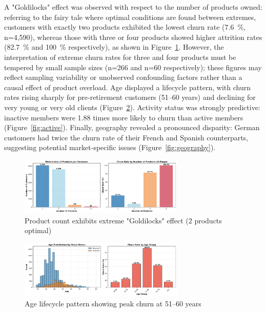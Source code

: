 \documentclass[12pt]{article}
\begin{document}
A "Goldilocks" effect was observed with respect to the number of products owned: referring to the fairy tale where optimal conditions are found between extremes, customers with exactly two products exhibited the lowest churn rate (7.6~\%, n=4,590), whereas those with three or four products showed higher attrition rates (82.7~\% and 100~\% respectively), as shown in Figure~\ref{fig:products}.  However, the interpretation of extreme churn rates for three and four products must be tempered by small sample sizes (n=266 and n=60 respectively); these figures may reflect sampling variability or unobserved confounding factors rather than a causal effect of product overload.  Age displayed a lifecycle pattern, with churn rates rising sharply for pre‑retirement customers (51–60 years) and declining for very young or very old clients (Figure~\ref{fig:age}).  Activity status was strongly predictive: inactive members were 1.88 times more likely to churn than active members (Figure~\ref{fig:active}).  Finally, geography revealed a pronounced disparity: German customers had twice the churn rate of their French and Spanish counterparts, suggesting potential market‑specific issues (Figure~\ref{fig:geography}).

\begin{figure}[H]
\centering
\includegraphics[width=0.7\textwidth]{img/04_products_churn_analysis.png}
\caption{Product count exhibits extreme "Goldilocks" effect (2 products optimal)}
\label{fig:products}
\end{figure}

\begin{figure}[H]
\centering
\includegraphics[width=0.7\textwidth]{img/03_age_distribution_churn.png}
\caption{Age lifecycle pattern showing peak churn at 51–60 years}
\label{fig:age}
\end{figure}
\end{document}
